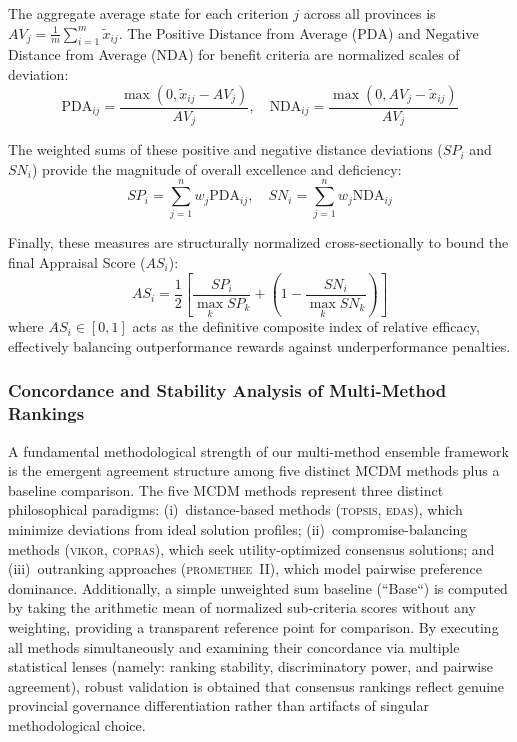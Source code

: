 \documentclass[12pt,a4paper]{article}
\newcommand{\TOPSIS}{\textsc{topsis}\xspace}
\newcommand{\VIKOR}{\textsc{vikor}\xspace}
\newcommand{\COPRAS}{\textsc{copras}\xspace}
\newcommand{\EDAS}{\textsc{edas}\xspace}
\newcommand{\PROMETHEE}{\textsc{promethee}\xspace}
\begin{document}
The aggregate average state for each criterion \( j \) across all provinces is \( AV_j = \frac{1}{m} \sum_{i=1}^{m} \tilde{x}_{ij} \). The Positive Distance from Average (\( \text{PDA} \)) and Negative Distance from Average (\( \text{NDA} \)) for benefit criteria are normalized scales of deviation:
\begin{equation}
    \text{PDA}_{ij} = \frac{\max(0, \tilde{x}_{ij} - AV_j)}{AV_j}, \quad 
    \text{NDA}_{ij} = \frac{\max(0, AV_j - \tilde{x}_{ij})}{AV_j}
\end{equation}

The weighted sums of these positive and negative distance deviations (\( SP_i \) and \( SN_i \)) provide the magnitude of overall excellence and deficiency:
\begin{equation}
    SP_i = \sum_{j=1}^{n} w_j \text{PDA}_{ij}, \quad SN_i = \sum_{j=1}^{n} w_j \text{NDA}_{ij}
\end{equation}

Finally, these measures are structurally normalized cross-sectionally to bound the final Appraisal Score (\( AS_i \)):
\begin{equation}
    AS_i = \frac{1}{2} \left[ \frac{SP_i}{\max_k SP_k} + \left( 1 - \frac{SN_i}{\max_k SN_k} \right) \right]
\end{equation}
where \( AS_i \in [0,1] \) acts as the definitive composite index of relative efficacy, effectively balancing outperformance rewards against underperformance penalties.

\subsubsection{Concordance and Stability Analysis of Multi-Method Rankings}

A fundamental methodological strength of our multi-method ensemble framework is the emergent agreement structure among five distinct MCDM methods plus a baseline comparison. The five MCDM methods represent three distinct philosophical paradigms: (i)~distance-based methods (\TOPSIS, \EDAS), which minimize deviations from ideal solution profiles; (ii)~compromise-balancing methods (\VIKOR, \COPRAS), which seek utility-optimized consensus solutions; and (iii)~outranking approaches (\PROMETHEE~II), which model pairwise preference dominance. Additionally, a simple unweighted sum baseline (``Base``) is computed by taking the arithmetic mean of normalized sub-criteria scores without any weighting, providing a transparent reference point for comparison. By executing all methods simultaneously and examining their concordance via multiple statistical lenses (namely: ranking stability, discriminatory power, and pairwise agreement), robust validation is obtained that consensus rankings reflect genuine provincial governance differentiation rather than artifacts of singular methodological choice.
\end{document}
